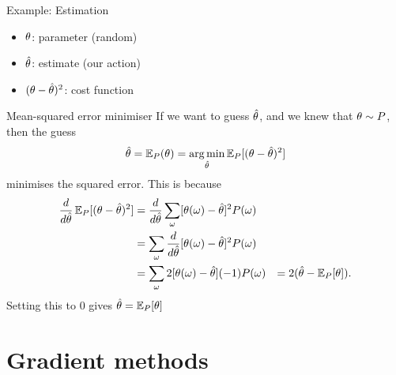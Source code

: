 \documentclass[smaller]{beamer}
\begin{document}
\begin{frame}[label={sec:org7b46877}]{Example: Estimation}
\begin{itemize}
\item \(\theta\): \alert{parameter} (random)
\item \(\hat{\theta}\): \alert{estimate} (our action)
\item \((\theta - \hat{\theta})^2\): \alert{cost} function
\end{itemize}
\pause
\begin{block}{Mean-squared error minimiser}
If we want to guess \(\hat{\theta}\), and we knew that \(\theta \sim P\), then the guess
\[
\hat{\theta} = \mathop{\mbox{\ensuremath{\mathbb{E}}}}\nolimits_P(\theta) = \operatorname*{arg\,min}_{\hat{\theta}} \mathop{\mbox{\ensuremath{\mathbb{E}}}}\nolimits_P [(\theta - \hat{\theta})^2]
\]
minimises the squared error. 
\pause
This is because
\begin{align}
\frac{d}{d \hat{\theta}}
 \mathop{\mbox{\ensuremath{\mathbb{E}}}}\nolimits_P [(\theta - \hat{\theta})^2]
&=
\frac{d}{d \hat{\theta}}
 \sum_\omega [\theta(\omega) -  \hat{\theta}]^2 P(\omega)\\
&=
 \sum_\omega \frac{d}{d \hat{\theta}}
 [\theta(\omega) -  \hat{\theta}]^2 P(\omega)\\
&=
 \sum_\omega 2 [\theta(\omega) -  \hat{\theta}] (-1) P(\omega)
&=
	 2 (\hat{\theta} - \mathop{\mbox{\ensuremath{\mathbb{E}}}}\nolimits_P [\theta]).
\end{align}
Setting this to \(0\) gives \(\hat{\theta} =\mathop{\mbox{\ensuremath{\mathbb{E}}}}\nolimits_P [\theta]\)
\end{block}
\end{frame}

\section{Gradient methods}
\label{sec:orgdae3fa2}
\end{document}
